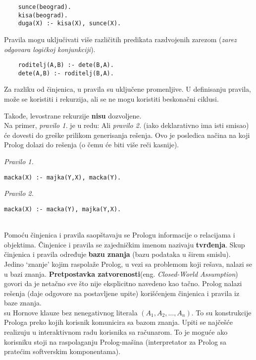 \documentclass[../main.tex]{subfiles}
\begin{document}
\begin{multicols}{2}
\begin{boxprimer}
\begin{Verbatim}
	sunce(beograd).
	kisa(beograd).
	duga(X) :- kisa(X), sunce(X).
\end{Verbatim}
\end{boxprimer}
\columnbreak
Pravila mogu uključivati više različitih predikata \break razdvojenih zarezom ({\it zarez odgovara logičkoj konjunkciji}).
\end{multicols}

\begin{multicols}{2}
\begin{boxprimer}
\begin{Verbatim}
	roditelj(A,B) :- dete(B,A).
	dete(A,B) :- roditelj(B,A).
\end{Verbatim}
\end{boxprimer}
\columnbreak
Za razliku od činjenica, u pravila su uključene promenljive. U definisanju pravila, može se koristiti i rekurzija, ali se ne mogu koristiti beskonačni ciklusi.
\end{multicols}

\begin{multicols}{2}
Takođe, levostrane rekurzije {\bf nisu} dozvoljene. \\Na primer, {\it pravilo 1.} je u redu:
Ali {\it pravilo 2.} \break (iako deklarativno ima isti smisao) će dovesti do greške prilikom generisanja rešenja. Ovo je posledica načina na koji Prolog dolazi do rešenja (o čemu će biti više reči kasnije).
\columnbreak
\begin{boxprimer}
{\it Pravilo 1.}
\begin{Verbatim}
macka(X) :- majka(Y,X), macka(Y).
\end{Verbatim}
{\it Pravilo 2.}
\begin{Verbatim}
macka(X) :- macka(Y), majka(Y,X).
\end{Verbatim}
\end{boxprimer}
\end{multicols}

\\
\noindent Pomoću činjenica i pravila saopštavaju se Prologu informacije o relacijama i objektima. Činjenice i pravila se zajedničkim imenom nazivaju {\bf tvrđenja}. Skup činjenica i pravila određuje {\bf bazu znanja} (bazu podataka u širem smislu).
\\
\indent Jedino `znanje' kojim raspolaže Prolog, u vezi sa problemom koji rešava, nalazi se u bazi znanja. {\bf Pretpostavka zatvorenosti}(eng. {\it Closed-World Assumption}) govori da je netačno sve što nije eksplicitno navedeno kao tačno. Prolog nalazi rešenja (daje odgovore na postavljene upite) korišćenjem činjenica i pravila iz baze znanja.
\\
 su Hornove klauze bez nenegativnog literala $(A_1,  A_2, \ldots, A_n)$. To su konstrukcije Prologa preko kojih korisnik komunicira sa bazom znanja. Upiti se najčešće realizuju u interaktivnom radu korisnika sa računarom. To je moguće ako korisniku stoji na raspolaganju Prolog-mašina (interpretator za Prolog sa pratećim softverskim komponentama).
\end{document}
